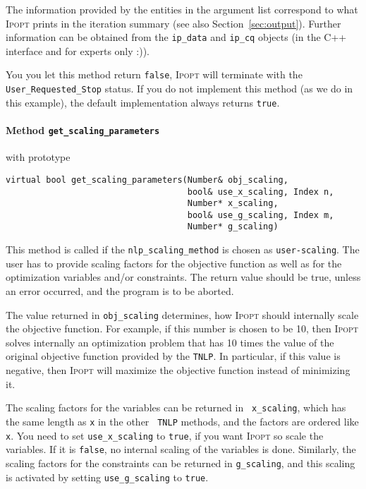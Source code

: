 \documentclass[10pt]{article}
\newcommand{\Ipopt}{\textsc{Ipopt}\xspace}
\begin{document}
The information provided by the entities in the argument list
correspond to what \Ipopt prints in the iteration summary (see also
Section~\ref{sec:output}).  Further information can be obtained from
the {\tt ip\_data} and {\tt ip\_cq} objects (in the C++ interface and for experts only :)).

You you let this method return {\tt false}, \Ipopt will terminate
with the {\tt User\_Requested\_Stop} status.  If you do not implement
this method (as we do in this example), the default implementation
always returns {\tt true}.

\paragraph{Method \texttt{get\_scaling\_parameters}} with prototype
\begin{verbatim}
virtual bool get_scaling_parameters(Number& obj_scaling,
                                    bool& use_x_scaling, Index n,
                                    Number* x_scaling,
                                    bool& use_g_scaling, Index m,
                                    Number* g_scaling)
\end{verbatim}

This method is called if the {\tt nlp\_scaling\_method} is chosen as
{\tt user-scaling}.  The user has to provide scaling factors for
the objective function as well as for the optimization variables
and/or constraints.  The return value should be true, unless an error
occurred, and the program is to be aborted.

The value returned in {\tt obj\_scaling} determines, how \Ipopt
should internally scale the objective function.  For example, if this
number is chosen to be 10, then \Ipopt solves internally an
optimization problem that has 10 times the value of the original
objective function provided by the {\tt TNLP}.  In particular, if this
value is negative, then \Ipopt will maximize the objective function
instead of minimizing it.

The scaling factors for the variables can be returned in {\tt
  x\_scaling}, which has the same length as {\tt x} in the other {\tt
  TNLP} methods, and the factors are ordered like {\tt x}.  You need
to set {\tt use\_x\_scaling} to {\tt true}, if you want \Ipopt so scale
the variables.  If it is {\tt false}, no internal scaling of the
variables is done.  Similarly, the scaling factors for the constraints
can be returned in {\tt g\_scaling}, and this scaling is activated by
setting {\tt use\_g\_scaling} to {\tt true}.
\end{document}
